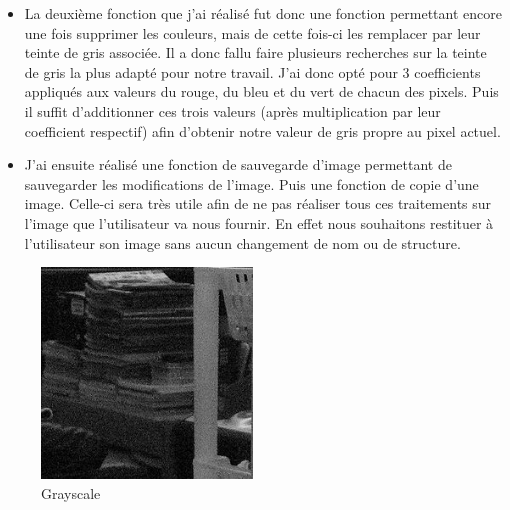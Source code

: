 \documentclass[12pt]{report}
\begin{document}
\newpage
\begin{itemize}[label=\textbullet]
	\item La deuxième fonction que j’ai réalisé fut donc une fonction permettant encore une fois supprimer les couleurs, mais de cette fois-ci les remplacer par leur teinte de gris associée. Il a donc fallu faire plusieurs recherches sur la teinte de gris la plus adapté pour notre travail. J’ai donc opté pour 3 coefficients appliqués aux valeurs du rouge, du bleu et du vert de chacun des pixels. Puis il suffit d’additionner ces trois valeurs (après multiplication par leur coefficient respectif) afin d’obtenir notre valeur de gris propre au pixel actuel. 
	\item J’ai ensuite réalisé une fonction de sauvegarde d’image permettant de sauvegarder les modifications de l’image. Puis une fonction de copie d’une image. Celle-ci sera très utile afin de ne pas réaliser tous ces traitements sur l’image que l’utilisateur va nous fournir. En effet nous souhaitons restituer à l’utilisateur son image sans aucun changement de nom ou de structure. 
\end{itemize}
\begin{figure}[H]
    \centering
    \includegraphics[width=0.5\textwidth]{grayscale}
    \caption{Grayscale}
\end{figure}
\end{document}
